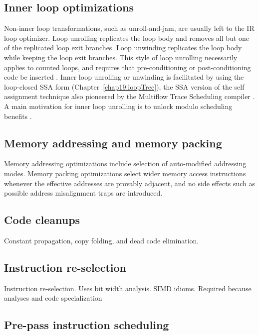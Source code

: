 \subsection{Inner loop optimizations}

Non-inner loop transformations, such as
unroll-and-jam, are usually left to the IR loop optimizer. Loop unrolling
replicates the loop body and removes all but one of the replicated loop exit
branches. Loop unwinding replicates the loop body while keeping the loop exit
branches. This style of loop unrolling necessarily applies to counted loops, and
requires that pre-conditioning or post-conditioning code be inserted
\cite{Lowney:1993:JS}. Inner loop unrolling or unwinding is facilitated by using
the loop-closed SSA form (Chapter~\ref{chap19:loopTree}), the SSA version of the
self assignment technique also pioneered by the Multiflow Trace Scheduling
compiler \cite{Lowney:1993:JS}. A main motivation for inner loop unrolling is to
unlock modulo scheduling benefits \cite{Lavery:1995:MICRO}.



\subsection{Memory addressing and memory packing}

Memory addressing optimizations include selection of auto-modified addressing
modes. Memory packing optimizations select wider memory access instructions
whenever the effective addresses are provably adjacent, and no side effects such
as possible address misalignment traps are introduced.

\subsection{Code cleanups}

Constant propagation, copy folding, and dead code elimination.

\subsection{Instruction re-selection}

Instruction re-selection. Uses bit width analysis. SIMD idioms.
Required because analyses and code specialization

\subsection{Pre-pass instruction scheduling}

